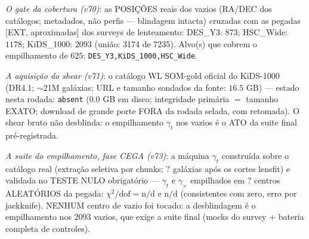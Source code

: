 \documentclass[11pt]{article}
\theoremstyle{definition}\newtheorem{deriv}{Derivação}
\begin{document}
\emph{O gate da cobertura (v70)}: as POSIÇÕES reais dos vazios (RA/DEC dos catálogos; metadados, não perfis --- blindagem intacta) cruzadas com as pegadas [EXT, aproximadas] dos surveys de lenteamento: DES\_Y3: $873$; HSC\_Wide: $1178$; KiDS\_1000: $2093$ (união: 3174 de 7235). Alvo(s) que cobrem o empilhamento de $625$: \texttt{DES\_Y3,KiDS\_1000,HSC\_Wide}.

\emph{A aquisição do shear (v71)}: o catálogo WL SOM-gold oficial do KiDS-1000 (DR4.1; $\sim$21M galáxias; URL e tamanho sondados da fonte: $16.5$ GB) --- estado nesta rodada: \texttt{absent} ($0.0$ GB em disco; integridade primária $=$ tamanho EXATO; download de grande porte FORA da rodada selada, com retomada). O shear bruto não desblinda: o empilhamento $\gamma_t$ nos vazios é o ATO da suite final pré-registrada.

\emph{A suite do empilhamento, fase CEGA (v73)}: a máquina $\gamma_t$ construída sobre o catálogo real (extração seletiva por chunks; $?$ galáxias após os cortes lensfit) e validada no TESTE NULO obrigatório --- $\gamma_t$ e $\gamma_\times$ empilhados em $?$ centros ALEATÓRIOS da pegada: $\chi^2/\mathrm{dof}=\text{n/d}$ e $\text{n/d}$ (consistentes com zero, erro por jackknife). NENHUM centro de vazio foi tocado: a desblindagem é o empilhamento nos $2093$ vazios, que exige a suite final (mocks do survey $+$ bateria completa de controles).
\end{document}
